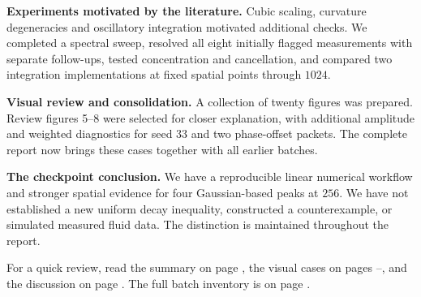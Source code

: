 \documentclass[10pt,letterpaper]{article}
\numberwithin{equation}{section}
\newcommand{\callout}[1]{\par\medskip\noindent #1\par\medskip}
\begin{document}
\textbf{Experiments motivated by the literature.} Cubic scaling, curvature
degeneracies and oscillatory integration motivated additional checks. We completed
a spectral sweep, resolved all eight initially flagged measurements with separate
follow-ups, tested concentration and cancellation, and compared two integration
implementations at fixed spatial points through $1024$.

\textbf{Visual review and consolidation.} A collection of twenty figures was
prepared. Review figures 5--8 were selected for closer explanation, with additional
amplitude and weighted diagnostics for seed 33 and two phase-offset packets.
The complete report now brings these cases together with all earlier batches.

\callout{\textbf{The checkpoint conclusion.} We have a reproducible linear
numerical workflow and stronger spatial evidence for four Gaussian-based peaks
at $256$. We have not established a new uniform decay inequality, constructed a
counterexample, or simulated measured fluid data. The distinction is maintained
throughout the report.}

For a quick review, read the summary on page \pageref{summary}, the visual cases
on pages \pageref{randomvolume}--\pageref{pairslice}, and the discussion on page
\pageref{discussion}. The full batch inventory is on page \pageref{guide}.
\end{document}
